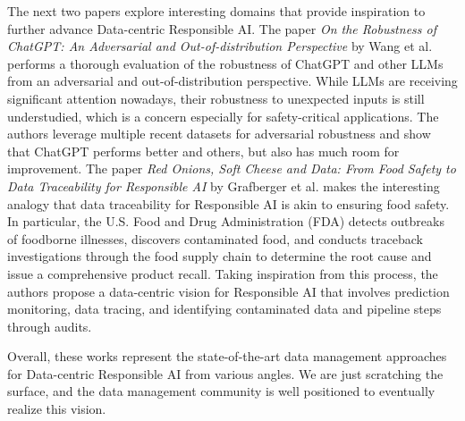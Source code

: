 \documentclass[11pt]{article}
\begin{document}
The next two papers explore interesting domains that provide inspiration to further advance Data-centric Responsible AI. 
The paper {\it On the Robustness of ChatGPT: An Adversarial and Out-of-distribution Perspective} by Wang et al. performs a thorough evaluation of the robustness of ChatGPT and other LLMs from an adversarial and out-of-distribution perspective. While LLMs are receiving significant attention nowadays, their robustness to unexpected inputs is still understudied, which is a concern especially for safety-critical applications. The authors leverage multiple recent datasets for adversarial robustness and show that ChatGPT performs better and others, but also has much room for improvement.
The paper {\it Red Onions, Soft Cheese and Data:
From Food Safety to Data Traceability for Responsible AI} by Grafberger et al. makes the interesting analogy that data traceability for Responsible AI is akin to ensuring food safety. In particular, the U.S. Food and Drug Administration (FDA) detects outbreaks of foodborne illnesses, discovers contaminated food, and conducts traceback investigations through the food supply chain to determine the root cause and issue a comprehensive product recall. Taking inspiration from this process, the authors propose a data-centric vision for Responsible AI that involves prediction monitoring, data tracing, and identifying contaminated data and pipeline steps through audits.


Overall, these works represent the state-of-the-art data management approaches for Data-centric Responsible AI from various angles. We are just scratching the surface, and the data management community is well positioned to eventually realize this vision. 


\end{document}
